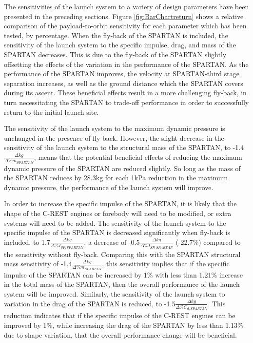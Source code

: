 The sensitivities of the launch system to a variety of design parameters have been presented in the preceding sections. Figure \ref{fig:BarChartreturn} shows a relative comparison of the payload-to-orbit sensitivity for each parameter which has been tested, by percentage. 
When the fly-back of the SPARTAN is included, the sensitivity of the launch system to the specific impulse, drag, and mass of the SPARTAN decreases.  
This is due to the fly-back of the SPARTAN slightly offsetting the effects of the variation in the performance of the SPARTAN. As the performance of the SPARTAN improves, the velocity at SPARTAN-third stage separation increases, as well as the ground distance which the SPARTAN covers during its ascent. These beneficial effects result in a more challenging fly-back, in turn necessitating the SPARTAN to trade-off performance in order to successfully return to the initial launch site.

The sensitivity of the launch system to the maximum dynamic pressure is unchanged in the presence of fly-back. However, the slight decrease in the sensitivity of the launch system to the structural mass of the SPARTAN, to -1.4$\frac{\Delta kg}{\Delta\%m_{SPARTAN}}$, means that the potential beneficial effects of reducing the maximum dynamic pressure of the SPARTAN are reduced slightly. So long as the mass of the SPARTAN reduces by 28.3kg for each 1kPa reduction in the maximum dynamic pressure, the performance of the launch system will improve.

In order to increase the specific impulse of the SPARTAN, it is likely that the shape of the C-REST engines or forebody will need to be modified, or extra systems will need to be added. 
 The sensitivity of the launch system to the specific impulse of the SPARTAN is decreased significantly when fly-back is included, to 1.7$\frac{\Delta kg}{\Delta\%I_{SP,SPARTAN}}$, a decrease of -0.5$\frac{\Delta kg}{\Delta\%I_{SP,SPARTAN}}$ (-22.7\%) compared to the sensitivity without fly-back. Comparing this with the SPARTAN structural mass sensitivity of -1.4$\frac{\Delta kg}{\Delta\%m_{SPARTAN}}$, this sensitivity implies that if the specific impulse of the SPARTAN can be increased by 1\% with less than 1.21\% increase in the total mass of the SPARTAN, then the overall performance of the launch system will be improved.  
Similarly, the sensitivity of the launch system to variation in the drag of the SPARTAN is reduced, to -1.5$\frac{\Delta kg}{\Delta\%C_{d,SPARTAN}}$. This reduction indicates that if the specific impulse of the C-REST engines can be improved by 1\%, while increasing the drag of the SPARTAN by less than 1.13\% due to shape variation, that the overall performance change will be beneficial. 








